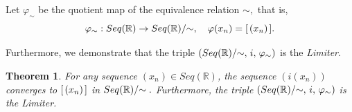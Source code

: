 \documentclass{amsart}
\theoremstyle{definition}
\theoremstyle{plain}
\newtheorem{theorem}{Theorem}
\begin{document}
Let  $\varphi_{\sim}$ be the quotient map of the equivalence relation $\sim,$ that is, 
$$\varphi_{\sim}: Seq(\mathbb{R}) \to Seq(\mathbb{R})/\hspace{-1mm}\sim,\quad \varphi(x_n) = [\hspace{0.5mm}(x_n)\hspace{0.5mm}].$$

Furthermore, we demonstrate that the triple $(Seq(\mathbb{R})/\hspace{-1mm}\sim,\hspace{0.5mm} i,\hspace{0.5mm} \varphi_{\sim})$ is the \emph{Limiter}.
\par\medskip


\begin{theorem} For any sequence $(x_n) \in Seq(\mathbb{R})$, the sequence $(i(x_n))$  converges to $[\hspace{0.5mm}(x_n)\hspace{0.5mm}]$ in $Seq(\mathbb{R})/\hspace{-1mm}\sim.$
Furthermore, the triple $(Seq(\mathbb{R})/\hspace{-1mm}\sim,\,i,\,\varphi_{\sim})$ is the 
Limiter.  
  
\end{theorem}
\end{document}
